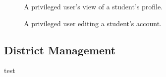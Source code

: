 \begin{figure}[h!]
	\centering
	\setlength\fboxsep{0pt}
	\caption{A privileged user's view of a student's profile.}
	\label{fig:screens-user-student-profile}
\end{figure}



\begin{figure}[h!]
	\centering
	\setlength\fboxsep{0pt}
	\caption{A privileged user editing a student's account.}
	\label{fig:screens-user-student-edit}
\end{figure}



\subsection{District Management}
\label{subsec:design-district}
test

